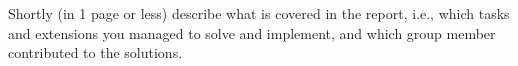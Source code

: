 Shortly (in 1 page or less) describe what is covered in the report, i.e., which tasks and extensions you managed to solve and implement, and which group member contributed to the solutions.